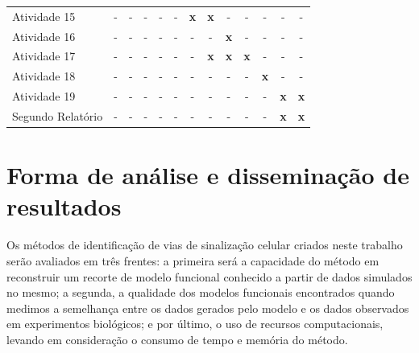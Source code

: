 \documentclass[12pt]{article}
\begin{document}
\begin{table}[ht!]
\begin{center}
{\begin{tabular}{l ccc ccc ccc ccc}
    \small Atividade 15
    & \small - & \small - & \small - & \small -  
    & \small - & \small {\bf x} & \small {\bf x} & \small -
    & \small - & \small - & \small - & \small - \\ 

    \small Atividade 16
    & \small - & \small - & \small - & \small -  
    & \small - & \small - & \small - & \small {\bf x}
    & \small - & \small - & \small - & \small - \\ 

    \small Atividade 17
    & \small - & \small - & \small - & \small -  
    & \small - & \small - & \small {\bf x} & \small {\bf x}
    & \small {\bf x} & \small - & \small - & \small - \\ 

    \small Atividade 18
    & \small - & \small - & \small - & \small -  
    & \small - & \small - & \small - & \small -
    & \small - & \small {\bf x} & \small - & \small - \\ 


    \small Atividade 19
    & \small - & \small - & \small - & \small -  
    & \small - & \small - & \small - & \small -
    & \small - & \small - & \small {\bf x} & \small {\bf x} \\ 



    \small Segundo Relatório
    & \small - & \small - & \small - & \small -  
    & \small - & \small - & \small - & \small -
    & \small - & \small - & \small {\bf x} & \small {\bf x} \\ 


    \bottomrule


\end{tabular}
}
\end{center}
\end{table}




\section{Forma de análise e disseminação de resultados}
Os métodos de identificação de vias de sinalização celular criados 
neste trabalho serão avaliados em três frentes: a primeira será a 
capacidade do método em reconstruir um recorte de modelo funcional
conhecido a partir de dados simulados no mesmo; a segunda, a qualidade
dos modelos funcionais encontrados quando medimos a semelhança entre
os dados gerados pelo modelo e os dados observados em experimentos 
biológicos; e por último, o uso de recursos computacionais, levando em 
consideração o consumo de tempo e memória do método.
\end{document}
